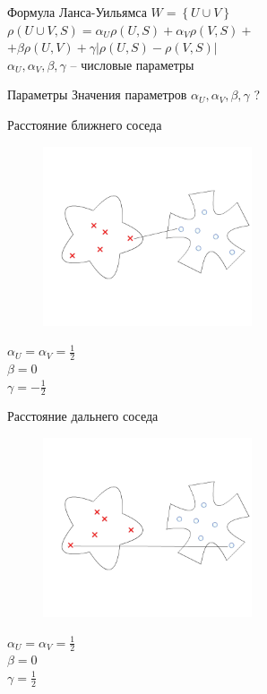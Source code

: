 \documentclass[10pt]{beamer}
\begin{document}
\begin{frame}{Формула Ланса-Уильямса}
	${ W = \left\{ U \cup V \right\} }$\\
	\bigbreak
	${\rho(U \cup V, S) = \alpha_U \rho(U, S) + \alpha_V \rho(V, S) + }$ \\
	\hspace{30mm} ${ + \beta \rho(U, V) + \gamma \vert \rho(U, S) - \rho(V, S)\vert}$\\
	\bigbreak
	${\alpha_U, \alpha_V, \beta, \gamma}$ -- числовые параметры
\end{frame}

\begin{frame}{Параметры}
	Значения параметров
	${\alpha_U, \alpha_V, \beta, \gamma}$ ?
\end{frame}

\begin{frame}{Расстояние ближнего соседа}
	\begin{figure}[htbp]
	  \includegraphics[height=150pt, keepaspectratio = true]{images/lans1}  
	\end{figure}
	\pause
	${\alpha_U = \alpha_V = \frac{1}{2}}$ \\${\beta = 0}$ \\${\gamma = -\frac{1}{2}}$
\end{frame}

\begin{frame}{Расстояние дальнего соседа}
	\begin{figure}[htbp]
	  \includegraphics[height=150pt, keepaspectratio = true]{images/lans2}  
	\end{figure}
	\pause
	${\alpha_U = \alpha_V = \frac{1}{2}}$ \\${\beta = 0}$ \\${\gamma = \frac{1}{2}}$
\end{frame}
\end{document}
